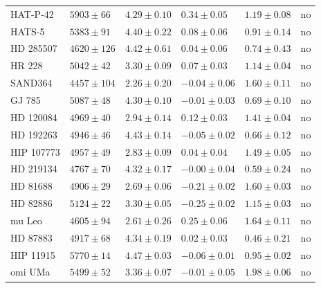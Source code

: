 \documentclass{aa}
\begin{document}
\begin{table}[htb!]
\begin{tabular}{llllll}
     HAT-P-42     &  $5903 \pm  66$      &  $4.29 \pm 0.10$    &  $ 0.34 \pm 0.05$    &  $1.19 \pm 0.08$             &  no \\
       HATS-5     &  $5383 \pm  91$      &  $4.40 \pm 0.22$    &  $ 0.08 \pm 0.06$    &  $0.91 \pm 0.14$             &  no \\
    HD 285507     &  $4620 \pm 126$      &  $4.42 \pm 0.61$    &  $ 0.04 \pm 0.06$    &  $0.74 \pm 0.43$             &  no \\
       HR 228     &  $5042 \pm  42$      &  $3.30 \pm 0.09$    &  $ 0.07 \pm 0.03$    &  $1.14 \pm 0.04$             &  no \\
      SAND364     &  $4457 \pm 104$      &  $2.26 \pm 0.20$    &  $-0.04 \pm 0.06$    &  $1.60 \pm 0.11$             &  no \\
       GJ 785     &  $5087 \pm  48$      &  $4.30 \pm 0.10$    &  $-0.01 \pm 0.03$    &  $0.69 \pm 0.10$             &  no \\
    HD 120084     &  $4969 \pm  40$      &  $2.94 \pm 0.14$    &  $ 0.12 \pm 0.03$    &  $1.41 \pm 0.04$             &  no \\
    HD 192263     &  $4946 \pm  46$      &  $4.43 \pm 0.14$    &  $-0.05 \pm 0.02$    &  $0.66 \pm 0.12$             &  no \\
   HIP 107773     &  $4957 \pm  49$      &  $2.83 \pm 0.09$    &  $ 0.04 \pm 0.04$    &  $1.49 \pm 0.05$             &  no \\
    HD 219134     &  $4767 \pm  70$      &  $4.32 \pm 0.17$    &  $-0.00 \pm 0.04$    &  $0.59 \pm 0.24$             &  no \\
     HD 81688     &  $4906 \pm  29$      &  $2.69 \pm 0.06$    &  $-0.21 \pm 0.02$    &  $1.60 \pm 0.03$             &  no \\
     HD 82886     &  $5124 \pm  22$      &  $3.30 \pm 0.05$    &  $-0.25 \pm 0.02$    &  $1.15 \pm 0.03$             &  no \\
       mu Leo     &  $4605 \pm  94$      &  $2.61 \pm 0.26$    &  $ 0.25 \pm 0.06$    &  $1.64 \pm 0.11$             &  no \\
     HD 87883     &  $4917 \pm  68$      &  $4.34 \pm 0.19$    &  $ 0.02 \pm 0.03$    &  $0.46 \pm 0.21$             &  no \\
    HIP 11915     &  $5770 \pm  14$      &  $4.47 \pm 0.03$    &  $-0.06 \pm 0.01$    &  $0.95 \pm 0.02$             &  no \\
      omi UMa     &  $5499 \pm  52$      &  $3.36 \pm 0.07$    &  $-0.01 \pm 0.05$    &  $1.98 \pm 0.06$             &  no \\

\end{tabular}
\end{table}
\end{document}
